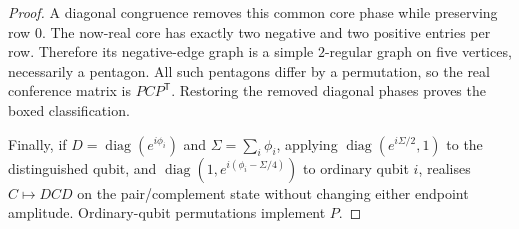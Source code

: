 \begin{proof}
A diagonal congruence removes this common core phase while preserving
row $0$. The now-real core has exactly two negative and two positive
entries per row. Therefore its negative-edge graph is a simple
$2$-regular graph on five vertices, necessarily a pentagon.
All such pentagons differ by a permutation, so the real conference
matrix is $PCP^{\mathsf T}$. Restoring the removed diagonal phases
proves the boxed classification.

Finally, if $D=\operatorname{diag}(e^{i\phi_i})$ and
$\Sigma=\sum_i\phi_i$, applying
$\operatorname{diag}(e^{i\Sigma/2},1)$ to the distinguished qubit,
and $\operatorname{diag}(1,e^{i(\phi_i-\Sigma/4)})$
to ordinary qubit $i$, realises $C\mapsto DCD$ on the
pair/complement state without changing either endpoint amplitude.
Ordinary-qubit permutations implement $P$.
\end{proof}
